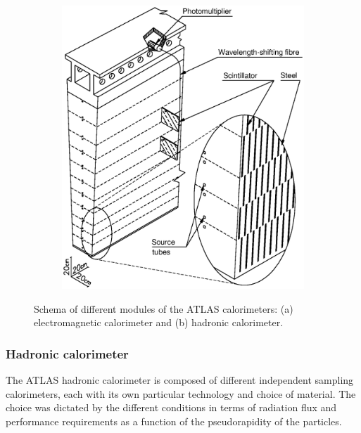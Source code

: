 \begin{figure}[!ht]
\begin{center}
\begin{subfigure}[b]{0.49\textwidth}
      \includegraphics[width=\textwidth]{ATLASdetector/Figures/TileCal_Module.eps}
      \caption{}
      \label{fig:TileCalModule}
    \end{subfigure}
    \label{fig:CalorimeterModules}
    \caption{Schema of different modules of the ATLAS calorimeters: (a) electromagnetic calorimeter and (b) hadronic calorimeter.}
  \end{center}
\end{figure}


\subsubsection{Hadronic calorimeter}
    \label{subsubsec:TileCal}
    The ATLAS hadronic calorimeter is composed of different independent sampling ca\-lo\-ri\-me\-ters, each with its own particular technology and choice of material.
The choice was dictated by the different conditions in terms of radiation flux and performance requirements as a function of the pseudorapidity of the particles.

